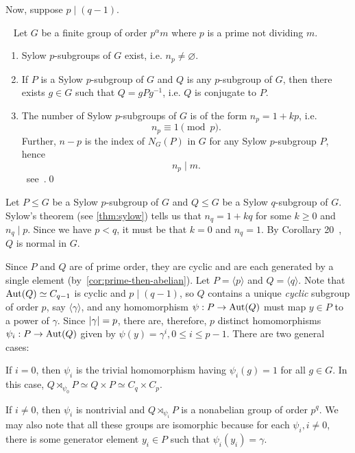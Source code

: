 Now, suppose $p \mid (q-1)$.

\begin{theorem}~\label{thm:sylow}
  Let $G$ be a finite group of order $p^{\alpha}m$ where $p$ is a prime not dividing $m$.
  \begin{enumerate}[label=\arabic{enumi}.]
    \item Sylow $p$-subgroups of $G$ exist, i.e. $n_p \ne \varnothing$.
    \item If $P$ is a Sylow $p$-subgroup of $G$ and $Q$ is any $p$-subgroup of $G$,
      then there exists $g \in G$ such that $Q = gPg^{-1}$, i.e. $Q$ is conjugate to $P$.
    \item The number of Sylow $p$-subgroups of $G$ is of the form
      $n_p = 1 + kp$, i.e. \[ n_p \equiv 1 \pmod p. \]
      Further, $n-p$ is the index of $N_G(P)$ in $G$ for any Sylow $p$-subgroup $P$,
      hence \[ n_p \mid m. \]~see~\cite[Theorem 18,~p.~139]{DummitFoote}.\qed
  \end{enumerate}
  
\end{theorem}

Let $P \le G$ be a Sylow $p$-subgroup of $G$
and $Q \le G$ be a Sylow $q$-subgroup of $G$.
Sylow's theorem (see \ref{thm:sylow}) tells us that
$n_q = 1 + kq$ for some $k \ge 0$ and $n_q \mid p$.
Since we have $p < q$, it must be that $k = 0$ and $n_q = 1$.
By Corollary 20~\cite[p. 142]{DummitFoote}, $Q$ is normal in $G$.


Since $P$ and $Q$ are of prime order, they are cyclic
and are each generated by a single element (by~\ref{cor:prime-then-abelian}).
Let $P = \langle p \rangle$ and $Q = \langle q \rangle$.
Note that $\operatorname{Aut}(Q) \simeq C_{q-1}$ is cyclic and $p \mid (q-1)$,
so $Q$ contains a unique \emph{cyclic} subgroup of order $p$,
say $\langle \gamma \rangle$,
and any homomorphism $\psi : P \to \operatorname{Aut}(Q)$ must map $y \in P$ to a power of $\gamma$.
Since $\lvert\gamma\rvert = p$, there are, therefore, $p$ distinct homomorphisms
$\psi_i : P \to \operatorname{Aut}(Q)$ given by $\psi(y) = \gamma^i, 0 \le i \le p-1$.
There are two general cases:
\begin{enumalph}
  \item If $i = 0$, then $\psi_i$ is the trivial homomorphism
    having $\psi_i(g) = 1$ for all $g \in G$. In this case,
    $Q \rtimes_{\psi_0} P \simeq Q \times P \simeq C_q \times C_p$.~\label{case:trivial-psi}
  \item If $i \ne 0$, then $\psi_i$ is nontrivial and $Q \rtimes_{\psi_i} P$
    is a nonabelian group of order $p^q$. We may also note that all these groups
    are isomorphic because for each $\psi_i, i \ne 0$, there is some generator
    element $y_i \in P$ such that $\psi_i(y_i) = \gamma$.~\cite[p. 181]{DummitFoote}
    ~\label{case:nontrivial_psi}
\end{enumalph}

